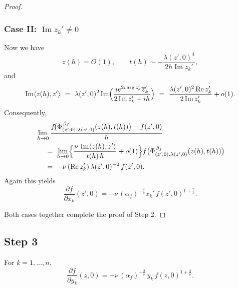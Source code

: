 \documentclass[reqno]{amsart}
\theoremstyle{definition}
\theoremstyle{remark}
\numberwithin{equation}{section}
\begin{document}
\begin{proof}
\subsubsection*{Case II: \( \operatorname{Im} z_k' \neq 0 \)}
Now we have
\[
z(h)=O(1),\qquad t(h)\sim -\frac{\lambda(z',0)^4}{2h\operatorname{Im} z_k'},
\]
and
\[
\operatorname{Im}\langle z(h),z'\rangle
~=~ \lambda(z',0)^2\operatorname{Im} \Bigl(\frac{i e^{2i\arg z_k'}\overline{z}_k'}
{2\operatorname{Im} z_k'+i h}\Bigr)
~=~ \frac{\lambda(z',0)^2\operatorname{Re} z_k'}{2\operatorname{Im} z_k'}+o(1).
\]
Consequently,
\begin{align*}
&\lim_{h\to 0}\frac{f\!\bigl(\Phi_{(z',0),\lambda(z',0)}^{\, \beta_f} (z(h),t(h))\bigr)-f(z',0)}{h} \\
&\quad ~=~ \lim_{h\to0}\Bigl\{\frac{\nu\,\operatorname{Im}\langle z(h),z'\rangle}{t(h)\,h}+o(1)\Bigr\}
        f \bigl(\Phi_{(z',0),\lambda(z',0)}^{\, \beta_f} (z(h),t(h))\bigr) \\
&\quad ~=~ -\nu\,(\operatorname{Re} z_k')\,\lambda(z',0)^{-2}\,f(z',0).
\end{align*}
Again this yields
\[
\frac{\partial f}{\partial x_k}(z',0)=-\nu\,(\alpha_f)^{-\frac{2}{\nu}}x_k'\,f(z',0)^{1+\frac{2}{\nu}} .
\]

Both cases together complete the proof of Step 2.
\end{proof}

\subsection*{Step 3}
For \( k = 1, \dots, n \),
\begin{equation}\label{eqn:partialy}
\frac{\partial f}{\partial y_k}(z,0)= -\nu\,(\alpha_f)^{-\frac{2}{\nu}}\,y_k\,f(z,0)^{1+\frac{2}{\nu}} .
\end{equation}
\end{document}
